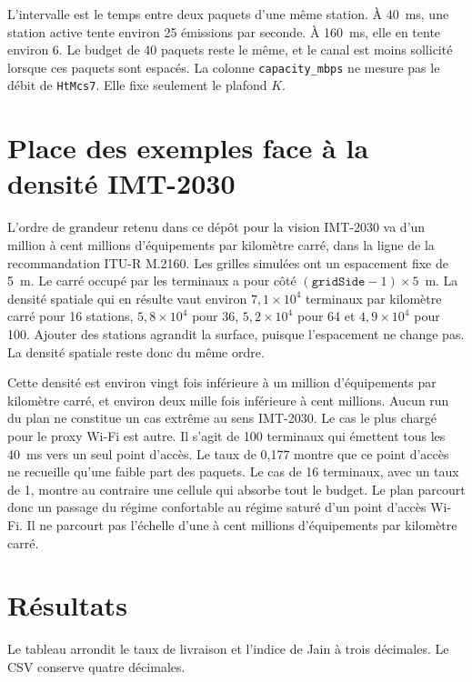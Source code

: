 \documentclass[11pt,a4paper]{article}
\begin{document}
L'intervalle est le temps entre deux paquets d'une même station. À 40~ms, une station active tente environ 25 émissions par seconde. À 160~ms, elle en tente environ 6. Le budget de 40 paquets reste le même, et le canal est moins sollicité lorsque ces paquets sont espacés. La colonne \texttt{capacity\_mbps} ne mesure pas le débit de \texttt{HtMcs7}. Elle fixe seulement le plafond $K$.

\section{Place des exemples face à la densité IMT-2030}

L'ordre de grandeur retenu dans ce dépôt pour la vision IMT-2030 va d'un million à cent millions d'équipements par kilomètre carré, dans la ligne de la recommandation ITU-R M.2160. Les grilles simulées ont un espacement fixe de 5~m. Le carré occupé par les terminaux a pour côté $(\texttt{gridSide}-1)\times 5$~m. La densité spatiale qui en résulte vaut environ $7{,}1\times 10^{4}$ terminaux par kilomètre carré pour 16 stations, $5{,}8\times 10^{4}$ pour 36, $5{,}2\times 10^{4}$ pour 64 et $4{,}9\times 10^{4}$ pour 100. Ajouter des stations agrandit la surface, puisque l'espacement ne change pas. La densité spatiale reste donc du même ordre.

Cette densité est environ vingt fois inférieure à un million d'équipements par kilomètre carré, et environ deux mille fois inférieure à cent millions. Aucun run du plan ne constitue un cas extrême au sens IMT-2030. Le cas le plus chargé pour le proxy Wi-Fi est autre. Il s'agit de 100 terminaux qui émettent tous les 40~ms vers un seul point d'accès. Le taux de 0,177 montre que ce point d'accès ne recueille qu'une faible part des paquets. Le cas de 16 terminaux, avec un taux de 1, montre au contraire une cellule qui absorbe tout le budget. Le plan parcourt donc un passage du régime confortable au régime saturé d'un point d'accès Wi-Fi. Il ne parcourt pas l'échelle d'une à cent millions d'équipements par kilomètre carré.

\section{Résultats}

Le tableau arrondit le taux de livraison et l'indice de Jain à trois décimales. Le CSV conserve quatre décimales.
\end{document}
